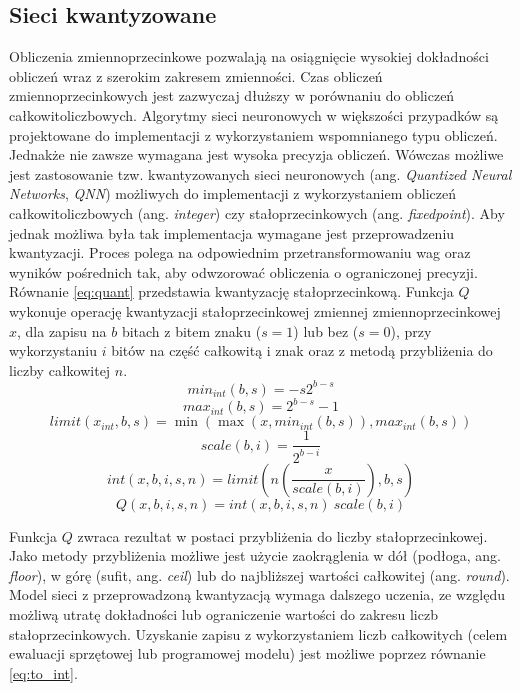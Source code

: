 \subsection{Sieci kwantyzowane}
Obliczenia zmiennoprzecinkowe pozwalają na osiągnięcie wysokiej dokładności obliczeń wraz z szerokim zakresem zmienności.
Czas obliczeń zmiennoprzecinkowych jest zazwyczaj dłuższy w porównaniu do obliczeń całkowitoliczbowych.
Algorytmy sieci neuronowych w większości przypadków są projektowane do implementacji z wykorzystaniem wspomnianego typu obliczeń. 
Jednakże nie zawsze wymagana jest wysoka precyzja obliczeń.
Wówczas możliwe jest zastosowanie tzw. kwantyzowanych sieci neuronowych (ang. \emph{Quantized Neural Networks}, \emph{QNN}) \cite{qnn} możliwych do implementacji z wykorzystaniem obliczeń całkowitoliczbowych (ang. \emph{integer}) czy stałoprzecinkowych (ang. \emph{fixedpoint}).
Aby jednak możliwa była tak implementacja wymagane jest przeprowadzeniu kwantyzacji.
Proces polega na odpowiednim przetransformowaniu wag oraz wyników pośrednich tak, aby odwzorować obliczenia o ograniczonej precyzji.
Równanie \eqref{eq:quant} przedstawia kwantyzację stałoprzecinkową.
Funkcja $Q$ wykonuje operację kwantyzacji stałoprzecinkowej zmiennej zmiennoprzecinkowej $x$, dla zapisu na $b$ bitach z bitem znaku ($s=1$) lub bez ($s=0$), przy wykorzystaniu $i$ bitów na część całkowitą i znak oraz z metodą przybliżenia do liczby całkowitej $n$.
\begin{equation}
min_{int}(b,s) = -s 2^{b-s}
\end{equation}
\begin{equation}
max_{int}(b,s) = 2^{b-s}-1
\end{equation}
\begin{equation}
limit(x_{int},b,s) = \min(\max(x,min_{int}(b,s)),max_{int}(b,s))
\end{equation}
\begin{equation}
scale(b,i) = \frac{1}{2^{b-i}}
\end{equation}
\begin{equation}
int(x,b,i,s,n) = limit(n(\frac{x}{scale(b,i)}), b,s)
\label{eq:to_int}
\end{equation}
\begin{equation}
Q(x,b,i,s,n) = int(x,b,i,s,n) \ scale(b,i)
\label{eq:quant}
\end{equation}

Funkcja $Q$ zwraca rezultat w postaci przybliżenia do liczby stałoprzecinkowej.
Jako metody przybliżenia możliwe jest użycie zaokrąglenia w dół (podłoga, ang. \emph{floor}), w górę (sufit, ang. \emph{ceil}) lub do najbliższej wartości całkowitej (ang. \emph{round}).
Model sieci z przeprowadzoną kwantyzacją wymaga dalszego uczenia, ze względu możliwą utratę dokładności lub ograniczenie wartości do zakresu liczb stałoprzecinkowych.
Uzyskanie zapisu z wykorzystaniem liczb całkowitych (celem ewaluacji sprzętowej lub programowej modelu) jest możliwe poprzez równanie \eqref{eq:to_int}.

